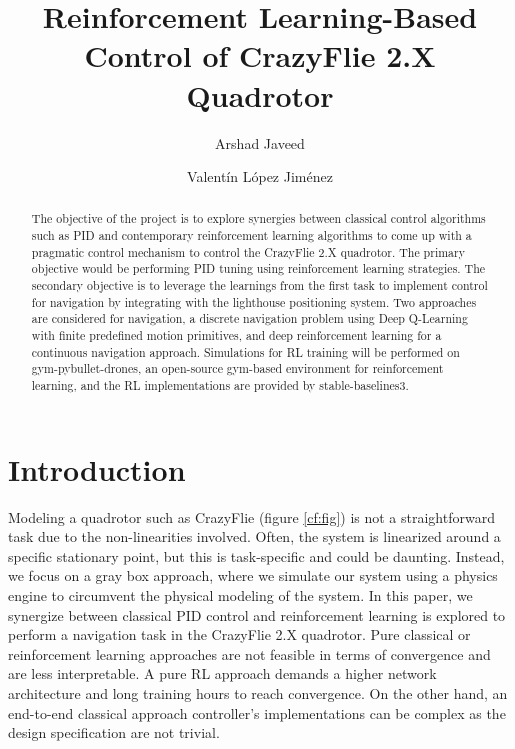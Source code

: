 \documentclass{LTHtwocol} %
\begin{document}
\begin{frontmatter}
\title{Reinforcement Learning-Based Control of CrazyFlie 2.X Quadrotor} %

\author[aj]{Arshad Javeed}
\author[val]{Valentín López Jiménez}



\begin{abstract}
The objective of the project is to explore synergies between classical control algorithms such as PID and contemporary reinforcement learning algorithms to come up with a pragmatic control mechanism to control the CrazyFlie 2.X quadrotor. The primary objective would be performing PID tuning using reinforcement learning strategies. The secondary objective is to leverage the learnings from the first task to implement control for navigation by integrating with the lighthouse positioning system. Two approaches are considered for navigation, a discrete navigation problem using Deep Q-Learning with finite predefined motion primitives, and deep reinforcement learning for a continuous navigation approach. Simulations for RL training will be performed on gym-pybullet-drones, an open-source gym-based environment for reinforcement learning, and the RL implementations are provided by stable-baselines3.
\end{abstract}

\end{frontmatter}
\section{Introduction}

Modeling a quadrotor such as CrazyFlie (figure \ref{cf:fig}) is not a straightforward task due to the non-linearities involved. Often, the system is linearized around a specific stationary point, but this is task-specific and could be daunting. Instead, we focus on a gray box approach, where we simulate our system using a physics engine \cite{pybullet_gym} to circumvent the physical modeling of the system.
In this paper, we synergize between classical PID control and reinforcement learning is explored to perform a navigation task in the CrazyFlie 2.X quadrotor. Pure classical or reinforcement learning approaches are not feasible in terms of convergence and are less interpretable. A pure RL approach demands a higher network architecture and long training hours to reach convergence. On the other hand, an end-to-end classical approach \cite{modelling_cf}\cite{nonlinear_control} controller's implementations can be complex as the design specification are not trivial.
 
\end{document}
